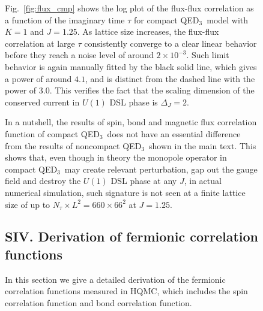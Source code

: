 \documentclass[aps,prl,twocolumn,superscriptaddress,showpacs,longbibliography]{revtex4-2}
\newcommand{\qed}{QED$_3$}
\newcommand{\reffg}[1]{\textmd{Fig.\ }\ref{#1}}
\begin{document}
\begin{figure}
\reffg{fig:flux_cmp} shows the log plot of the flux-flux correlation as a function of the imaginary time $\tau$ for compact \qed\ model with $K=1$ and $J=1.25$. As lattice size increases, the flux-flux correlation at large $\tau$ consistently converge to a clear linear behavior before they reach a noise level of around $2\times10^{-3}$. Such limit behavior is again manually fitted by the black solid line, which gives a power of around $4.1$, and is distinct from the dashed line with the power of $3.0$. This verifies the fact that the scaling dimension of the conserved current in $U(1)$ DSL phase is $\Delta_J = 2$.

In a nutshell, the results of spin, bond and magnetic flux correlation function of compact \qed\ does not have an essential difference from the results of noncompact \qed\ shown in the main text. This shows that, even though in theory the  monopole operator in compact \qed\ may create relevant perturbation, gap out the gauge field and destroy the $U(1)$ DSL phase at any $J$, in actual numerical simulation, such signature is not seen at a finite lattice size of up to $N_\tau \times L^2 = 660\times66^2$ at $J=1.25$.

\subsection*{SIV. Derivation of fermionic correlation functions}
\label{sec:SIV}
In this section we give a detailed derivation of the fermionic correlation functions measured in HQMC, which includes the spin correlation function and bond correlation function.


\end{figure}
\end{document}
